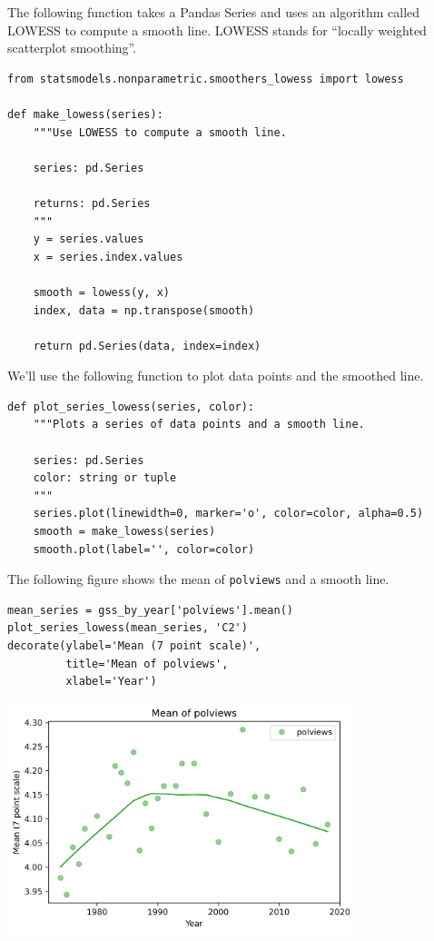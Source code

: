 The following function takes a Pandas Series and uses an algorithm
called LOWESS to compute a smooth line. LOWESS stands for ``locally
weighted scatterplot smoothing''.

\begin{lstlisting}[]
from statsmodels.nonparametric.smoothers_lowess import lowess

def make_lowess(series):
    """Use LOWESS to compute a smooth line.
    
    series: pd.Series
    
    returns: pd.Series
    """
    y = series.values
    x = series.index.values

    smooth = lowess(y, x)
    index, data = np.transpose(smooth)

    return pd.Series(data, index=index) 
\end{lstlisting}

We'll use the following function to plot data points and the smoothed
line.

\begin{lstlisting}[]
def plot_series_lowess(series, color):
    """Plots a series of data points and a smooth line.
    
    series: pd.Series
    color: string or tuple
    """
    series.plot(linewidth=0, marker='o', color=color, alpha=0.5)
    smooth = make_lowess(series)
    smooth.plot(label='', color=color)
\end{lstlisting}

The following figure shows the mean of
\passthrough{\lstinline!polviews!} and a smooth line.

\begin{lstlisting}[]
mean_series = gss_by_year['polviews'].mean()
plot_series_lowess(mean_series, 'C2')
decorate(ylabel='Mean (7 point scale)',
         title='Mean of polviews',
         xlabel='Year')
\end{lstlisting}

\begin{center}
\includegraphics[width=4in]{chapters/02_polviews_soln_files/02_polviews_soln_57_0.png}
\end{center}

